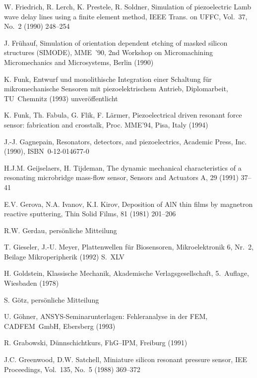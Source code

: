 \begin{thebibliography}{xxx}
 W. Friedrich, R. Lerch, K. Prestele, R. Soldner, Simulation of
 piezoelectric Lamb wave delay lines using a finite element method,
 IEEE Trans. on UFFC, Vol.~37, No.~2 (1990) 248--254

 J. Frühauf, Simulation of orientation dependent etching of masked silicon
 structures ({\sf SIMODE}), MME~'90, 2nd Workshop on Micromachining
 Micromechanics and Microsystems, Berlin (1990)

 K. Funk, Entwurf und monolithische Integration einer Schaltung für
 mikromechanische Sensoren mit piezoelektrischem Antrieb, Diplomarbeit,
 TU~Chemnitz (1993) unveröffentlicht

 K. Funk, Th. Fabula, G. Flik, F. Lärmer,
 Piezoelectrical driven resonant force sensor: fabrication and crosstalk,
 Proc. MME'94, Pisa, Italy (1994)

 J.-J. Gagnepain, Resonators, detectors, and piezoelectrics, Academic Press,
 Inc. (1990), ISBN~0-12-014677-0

 H.J.M. Geijselaers, H. Tijdeman, The dynamic mechanical characteristics of
 a resonating microbridge mass-flow sensor, Sensors and Actuators A, 29
 (1991) 37--41

 E.V. Gerova, N.A. Ivanov, K.I. Kirov, Deposition of AlN thin films by
 magnetron reactive sputtering, Thin Solid Films, 81 (1981) 201--206

 R.W. Gerdau, persönliche Mitteilung

 T. Gieseler, J.-U. Meyer, Plattenwellen für Biosensoren, Mikroelektronik 6,
 Nr.~2, Beilage Mikroperipherik (1992) S.~XLV

 H. Goldstein, Klassische Mechanik, Akademische Verlagsgesellschaft,
 5.~Auflage, Wiesbaden (1978)

 S. Götz, persönliche Mitteilung

 U. Göhner, {\sf ANSYS}-Seminarunterlagen: Fehleranalyse in der FEM,
 CADFEM~GmbH, Ebersberg (1993)

 R. Grabowski, Dünnschichtkurs, FhG--IPM, Freiburg (1991)

 J.C. Greenwood, D.W. Satchell, Miniature silicon resonant pressure sensor,
 IEE Proceedings, Vol.~135, No.~5 (1988) 369--372


\end{thebibliography}
